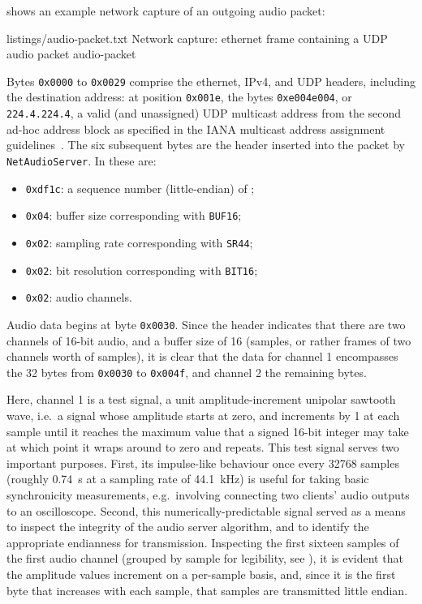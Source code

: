  shows an example network capture of an outgoing
audio packet:

{listings/audio-packet.txt}
{Network capture: ethernet frame containing a UDP audio packet}
{audio-packet}

Bytes \texttt{0x0000} to \texttt{0x0029} comprise the ethernet, IPv4, and UDP
headers, including the destination address: at position \texttt{0x001e}, the
bytes \texttt{0xe004e004}, or \texttt{224.4.224.4}, a valid (and unassigned)
UDP multicast address from the second ad-hoc address block as specified in the
IANA multicast address assignment guidelines~\citep{meyer_iana_2010}.
The six subsequent bytes are the header inserted into the packet by
\texttt{NetAudioServer}.
In  these are:
\begin{itemize}
    \item \texttt{0xdf1c}: a sequence number (little-endian) of ;
    \item \texttt{0x04}: buffer size  corresponding with
    \texttt{BUF16};
    \item \texttt{0x02}: sampling rate  corresponding with
    \texttt{SR44};
    \item \texttt{0x02}: bit resolution  corresponding with
    \texttt{BIT16};
    \item \texttt{0x02}:  audio channels.
\end{itemize}

Audio data begins at byte \texttt{0x0030}.
Since the header indicates that there are two channels of 16-bit audio, and a
buffer size of 16 (samples, or rather frames of two channels worth of samples),
it is clear that the data for channel 1 encompasses the 32 bytes from
\texttt{0x0030} to \texttt{0x004f}, and channel 2 the remaining bytes.

Here, channel 1 is a test signal, a unit amplitude-increment unipolar sawtooth
wave, i.e.\ a signal whose amplitude starts at zero, and increments by 1 at each
sample until it reaches the maximum value that a signed 16-bit integer may take
\textemdash{}  \textemdash{} at which point it wraps around to
zero and repeats.
This test signal serves two important purposes.
First, its impulse-like behaviour once every \num{32768} samples (roughly
\qty{.74}{\s} at a sampling rate of \qty{44.1}{\kHz}) is useful for taking basic
synchronicity measurements, e.g.\ involving connecting two clients' audio
outputs to an oscilloscope.
Second, this numerically-predictable signal served as a means to inspect the
integrity of the audio server algorithm, and to identify the appropriate
endianness for transmission.
Inspecting the first sixteen samples of the first audio channel (grouped
by sample for legibility, see ), it is evident
that the amplitude values increment on a per-sample basis, and, since it is the
first byte that increases with each sample, that samples are transmitted little
endian.

